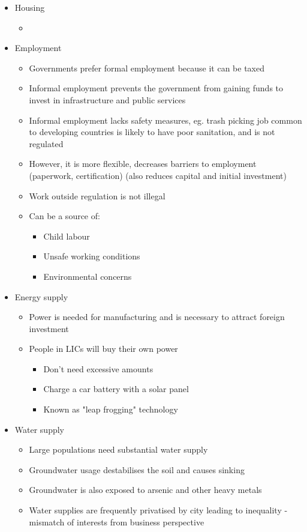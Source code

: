 	\begin{itemize}
		\item Housing
			\begin{itemize}
				\item 
			\end{itemize}

		\item Employment
			\begin{itemize}
				\item Governments prefer formal employment because it can be taxed
				\item Informal employment prevents the government from gaining funds to invest in infrastructure and public services
				\item Informal employment lacks safety measures, eg. trash picking job common to developing countries is likely to have poor sanitation, and is not regulated
				\item However, it is more flexible, decreases barriers to employment (paperwork, certification) (also reduces capital and initial investment)
				\item Work outside regulation is not illegal
				\item Can be a source of:
				\begin{itemize}
					\item Child labour
					\item Unsafe working conditions
					\item Environmental concerns
				\end{itemize}
			\end{itemize}

		\item Energy supply
			\begin{itemize}
				\item Power is needed for manufacturing and is necessary to attract foreign investment
				\item People in LICs will buy their own power
				\begin{itemize}
					\item Don't need excessive amounts
					\item Charge a car battery with a solar panel
					\item Known as "leap frogging" technology
				\end{itemize}
			\end{itemize}

		\item Water supply
			\begin{itemize}
				\item Large populations need substantial water supply
				\item Groundwater usage destabilises the soil and causes sinking
				\item Groundwater is also exposed to arsenic and other heavy metals
				\item Water supplies are frequently privatised by city leading to inequality - mismatch of interests from business perspective
			\end{itemize}


\end{itemize}
